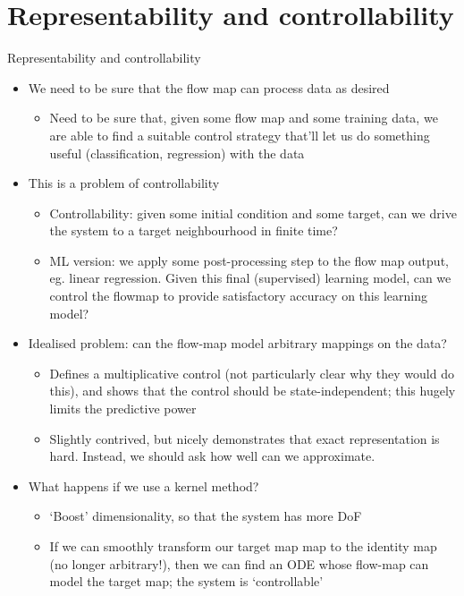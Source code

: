 \documentclass[presentation]{beamer}
\begin{document}
\section{Representability and controllability}
\label{sec:org223349d}
\begin{frame}[label={sec:orgc03b0ea},plain]{Representability and controllability}
\begin{itemize}
\item We need to be sure that the flow map can process data as desired
\begin{itemize}
\item Need to be sure that, given some flow map and some training data, we are able to find a suitable control strategy that'll let us do something useful (classification, regression) with the data
\end{itemize}

\item This is a problem of controllability
\begin{itemize}
\item Controllability: given some initial condition and some target, can we drive the system to a target neighbourhood in finite time?
\item ML version: we apply some post-processing step to the flow map output, eg. linear regression. Given this final (supervised) learning model, can we control the flowmap to provide satisfactory accuracy on this learning model?
\end{itemize}

\item Idealised problem: can the flow-map model arbitrary mappings on the data?
\begin{itemize}
\item Defines a multiplicative control (not particularly clear why they would do this), and shows that the control should be state-independent; this hugely limits the predictive power
\item Slightly contrived, but nicely demonstrates that exact representation is hard. Instead, we should ask how well can we approximate.
\end{itemize}

\item What happens if we use a kernel method?
\begin{itemize}
\item `Boost' dimensionality, so that the system has more DoF
\item If we can smoothly transform our target map map to the identity map (no longer arbitrary!), then we can find an ODE whose flow-map can model the target map; the system is `controllable'
\end{itemize}
\end{itemize}
\end{frame}
\end{document}
